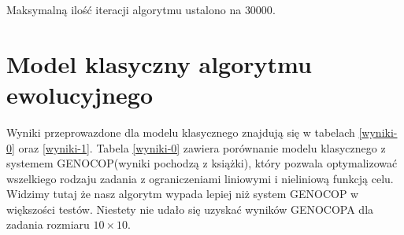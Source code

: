 Maksymalną ilość iteracji algorytmu ustalono na $30000$.

\section{Model klasyczny algorytmu ewolucyjnego}

Wyniki przeprowazdone dla modelu klasycznego znajdują się w tabelach \ref{wyniki-0} oraz \ref{wyniki-1}. Tabela \ref{wyniki-0} zawiera porównanie 
modelu klasycznego z systemem GENOCOP(wyniki pochodzą z książki\cite{ALG-GEN-BOOK}), który pozwala optymalizować wszelkiego rodzaju zadania z ograniczeniami liniowymi i nieliniową funkcją celu. 
Widzimy tutaj że nasz algorytm wypada lepiej niż system GENOCOP w większości testów. Niestety nie udało się uzyskać wyników GENOCOPA dla zadania rozmiaru 
$10 \times 10$.

